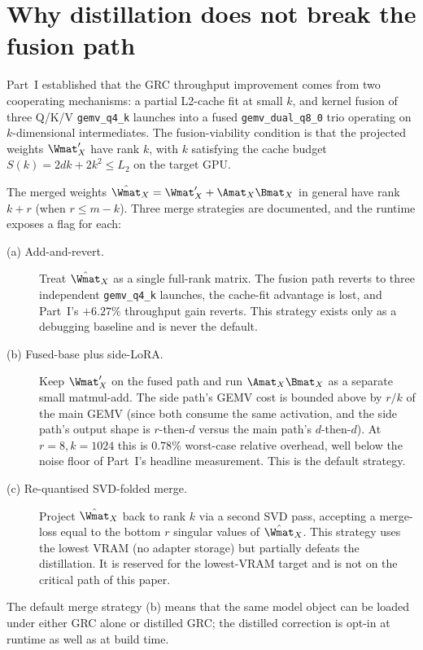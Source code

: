 \documentclass[11pt]{article}
\begin{document}
\section{Why distillation does not break the fusion path}
\label{sec:fusion-fit}

Part~I established that the GRC throughput improvement comes from
two cooperating mechanisms: a partial L2-cache fit at small $k$, and
kernel fusion of three Q/K/V \texttt{gemv\_q4\_k} launches into a fused
\texttt{gemv\_dual\_q8\_0} trio operating on $k$-dimensional
intermediates. The fusion-viability condition is that the projected
weights $\Wmat_X^\prime$ have rank $k$, with $k$ satisfying the cache
budget $S(k) = 2dk + 2k^2 \le L_2$ on the target GPU.

The merged weights $\hat{\Wmat}_X = \Wmat_X^\prime + \Amat_X \Bmat_X$
in general have rank $k+r$ (when $r \le m - k$). Three merge
strategies are documented, and the runtime exposes a flag for each:

\begin{description}
\item[(a) Add-and-revert.] Treat $\hat{\Wmat}_X$ as a single
      full-rank matrix. The fusion path reverts to three independent
      \texttt{gemv\_q4\_k} launches, the cache-fit advantage is lost,
      and Part~I's $+6.27\%$ throughput gain reverts. This strategy
      exists only as a debugging baseline and is never the default.
\item[(b) Fused-base plus side-LoRA.] Keep $\Wmat_X^\prime$ on the
      fused path and run $\Amat_X \Bmat_X$ as a separate small
      matmul-add. The side path's GEMV cost is bounded above by
      $r/k$ of the main GEMV (since both consume the same activation,
      and the side path's output shape is $r$-then-$d$ versus the main
      path's $d$-then-$d$). At $r{=}8, k{=}1024$ this is $0.78\%$
      worst-case relative overhead, well below the noise floor of
      Part~I's headline measurement. This is the default strategy.
\item[(c) Re-quantised SVD-folded merge.] Project $\hat{\Wmat}_X$
      back to rank $k$ via a second SVD pass, accepting a
      merge-loss equal to the bottom $r$ singular values of
      $\hat{\Wmat}_X$. This strategy uses the lowest VRAM (no adapter
      storage) but partially defeats the distillation. It is reserved
      for the lowest-VRAM target and is not on the critical path of
      this paper.
\end{description}

The default merge strategy (b) means that the same model object can
be loaded under either GRC alone or distilled GRC; the distilled
correction is opt-in at runtime as well as at build time.
\end{document}
